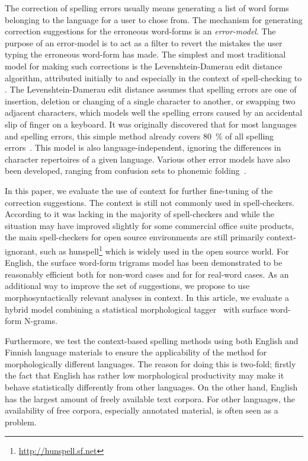 \documentclass{llncs}
\begin{document}
The correction of spelling errors usually means generating a list of word forms
belonging to the language for a user to chose from. The mechanism for generating 
correction suggestions for the erroneous word-forms
is an \emph{error-model}. The purpose of an error-model is to act as a
filter to revert the mistakes the user typing the erroneous word-form has made.
The simplest and most traditional model for making such corrections is the
Levenshtein-Damerau edit distance algorithm, attributed initially to
\cite{levenshtein/1966} and especially in the context of spell-checking to
\cite{damerau/1964}. The Levenshtein-Damerau edit distance assumes that spelling
errors are one of insertion, deletion or changing of a single character to
another, or swapping two adjacent characters, which models well the spelling
errors caused by an accidental slip of finger on a keyboard. It was originally
discovered that for most languages and spelling errors, this simple method
already covers 80~\% of all spelling errors~\cite{damerau/1964}. This model is
also language-independent, ignoring the differences in character repertoires of
a given language. Various other error models have also been developed, ranging
from confusion sets to phonemic folding~\cite{kukich/1992}.

In this paper, we evaluate the use of context for further fine-tuning of the
correction suggestions. The context is still not commonly used in
spell-checkers. According to \cite{kukich/1992} it was lacking in the majority
of spell-checkers and while the situation may have improved slightly for some
commercial office suite products, the main spell-checkers for open source
environments are still primarily context-ignorant, such as
hunspell\footnote{\url{http://hunspell.sf.net}} which is widely used in the open source
world.  For English, the surface word-form trigrams model has been demonstrated
to be reasonably efficient both for non-word cases \cite{church/1991} and
for for real-word cases\cite{mays/1991}. As an additional way to improve the 
set of suggestions, we propose to use morphosyntactically
relevant analyses in context. In this
article, we evaluate a hybrid model combining a statistical
morphological tagger~\cite{silfverberg/2011} with surface word-form
N-grams.

Furthermore, we test the context-based spelling methods using both English and
Finnish language materials to ensure the applicability of the method for
morphologically different languages. The reason for doing this is two-fold; firstly
the fact that English has rather low morphological productivity may make
it behave statistically differently from other languages. On the other hand,
English has the largest amount of freely available text corpora. For other
languages, the availability of free corpora, especially annotated material, is
often seen as a problem.
\end{document}

